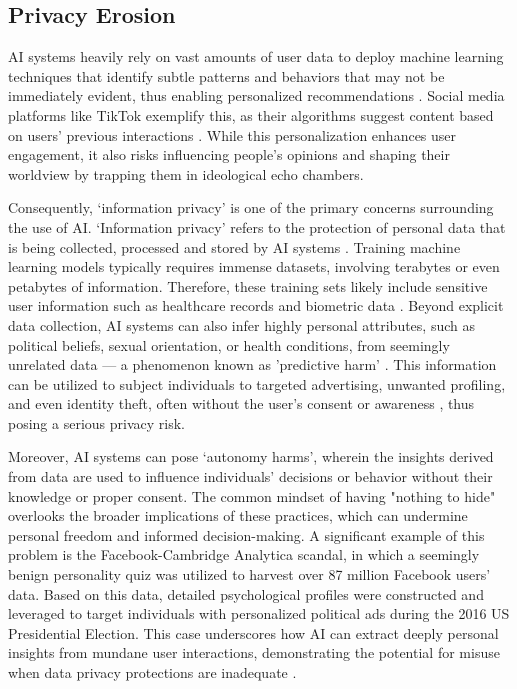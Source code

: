 \documentclass[licencjacka,en]{pracamgr}
\begin{document}
\subsection{Privacy Erosion}
AI systems heavily rely on vast amounts of user data to deploy machine learning techniques that identify subtle patterns and behaviors that may not be immediately evident, thus enabling personalized recommendations \cite{data_guard}. Social media platforms like TikTok exemplify this, as their algorithms suggest content based on users' previous interactions \cite{it_convergence} \cite{builtin}. While this personalization enhances user engagement, it also risks influencing people's opinions and shaping their worldview by trapping them in ideological echo chambers\cite{echo_chambers}.

Consequently, ‘information privacy’ is one of the primary concerns surrounding the use of AI. ‘Information privacy’ refers to the protection of personal data that is being collected, processed and stored by AI systems \cite{transcend}. Training machine learning models typically requires immense datasets, involving terabytes or even petabytes of information. Therefore, these training sets likely include sensitive user information such as healthcare records and biometric data \cite{ibm_vast_data}. Beyond explicit data collection, AI systems can also infer highly personal attributes, such as political beliefs, sexual orientation, or health conditions, from seemingly unrelated data — a phenomenon known as 'predictive harm' \cite{transcend}. This information can be utilized to subject individuals to targeted advertising, unwanted profiling, and even identity theft, often without the user’s consent or awareness \cite{data_guard}, thus posing a serious privacy risk.

Moreover, AI systems can pose ‘autonomy harms’, wherein the insights derived from data are used to influence individuals' decisions or behavior without their knowledge or proper consent. The common mindset of having "nothing to hide" overlooks the broader implications of these practices, which can undermine personal freedom and informed decision-making. A significant example of this problem is the Facebook-Cambridge Analytica scandal, in which a seemingly benign personality quiz was utilized to harvest over 87 million Facebook users’ data. Based on this data, detailed psychological profiles were constructed and leveraged to target individuals with personalized political ads during the 2016 US Presidential Election. This case underscores how AI can extract deeply personal insights from mundane user interactions, demonstrating the potential for misuse when data privacy protections are inadequate \cite{transcend}.
\end{document}
